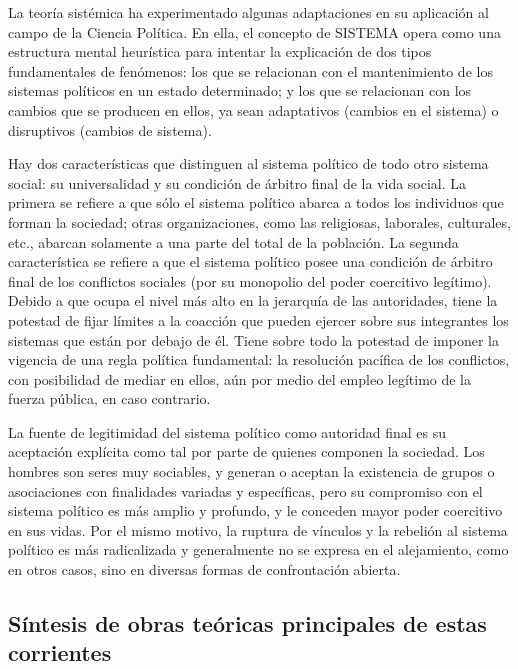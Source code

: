 \documentclass[
]{book}
\begin{document}
La teoría sistémica ha experimentado algunas adaptaciones en su aplicación al campo de la Ciencia Política. En ella, el concepto de SISTEMA opera como una estructura mental heurística para intentar la explicación de dos tipos fundamentales de fenómenos: los que se relacionan con el mantenimiento de los sistemas políticos en un estado determinado; y los que se relacionan con los cambios que se producen en ellos, ya sean adaptativos (cambios en el sistema) o disruptivos (cambios de sistema).

Hay dos características que distinguen al sistema político de todo otro sistema social: su universalidad y su condición de árbitro final de la vida social. La primera se refiere a que sólo el sistema político abarca a todos los individuos que forman la sociedad; otras organizaciones, como las religiosas, laborales, culturales, etc., abarcan solamente a una parte del total de la población. La segunda característica se refiere a que el sistema político posee una condición de árbitro final de los conflictos sociales (por su monopolio del poder coercitivo legítimo). Debido a que ocupa el nivel más alto en la jerarquía de las autoridades, tiene la potestad de fijar límites a la coacción que pueden ejercer sobre sus integrantes los sistemas que están por debajo de él. Tiene sobre todo la potestad de imponer la vigencia de una regla política fundamental: la resolución pacífica de los conflictos, con posibilidad de mediar en ellos, aún por medio del empleo legítimo de la fuerza pública, en caso contrario.

La fuente de legitimidad del sistema político como autoridad final es su aceptación explícita como tal por parte de quienes componen la sociedad. Los hombres son seres muy sociables, y generan o aceptan la existencia de grupos o asociaciones con finalidades variadas y específicas, pero su compromiso con el sistema político es más amplio y profundo, y le conceden mayor poder coercitivo en sus vidas. Por el mismo motivo, la ruptura de vínculos y la rebelión al sistema político es más radicalizada y generalmente no se expresa en el alejamiento, como en otros casos, sino en diversas formas de confrontación abierta.

\hypertarget{suxedntesis-de-obras-teuxf3ricas-principales-de-estas-corrientes}{%
\subsection*{Síntesis de obras teóricas principales de estas corrientes}\label{suxedntesis-de-obras-teuxf3ricas-principales-de-estas-corrientes}}
\end{document}
